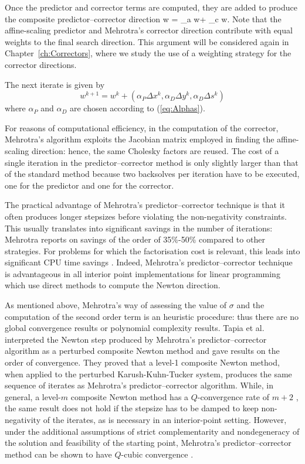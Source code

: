 Once the predictor and corrector terms are computed, they are 
added to produce the composite predictor--corrector direction
\be \label{eq:CompositeDirection}
\Delta w = \Delta_a w+ \Delta_c w.
\ee
Note that the affine-scaling predictor and Mehrotra's corrector direction 
contribute with equal weights to the final search direction. 
This argument will be considered again in Chapter~\ref{ch:Correctors}, 
where we study the use of a weighting strategy for the corrector
directions.

The next iterate is given by
\[
w^{k+1} = w^k
        + (\alpha_P\Delta x^k,\alpha_D\Delta y^k,\alpha_D\Delta s^k)
\]
where $\alpha_P$ and $\alpha_D$ are chosen according to (\ref{eq:Alphas}).

For reasons of computational efficiency, in the computation of
the corrector, Mehrotra's algorithm exploits 
the Jacobian matrix employed in finding the affine-scaling direction: 
hence, the same Cholesky factors are reused.
The cost of a single iteration in the predictor--corrector 
method is only slightly larger than that of the standard 
method because two backsolves per iteration have to be executed, 
one for the predictor and one for the corrector. 

The practical advantage of Mehrotra's predictor--corrector technique
is that it often produces longer stepsizes before violating the 
non-negativity constraints.
%
This usually translates into significant savings in the number of 
iterations: Mehrotra \cite{Mehrotra92} reports on savings of the
order of 35\%-50\% compared to other strategies.
For problems for which the factorisation cost is relevant, this
leads into significant 
CPU time savings \cite{LustigMarstenShanno,Mehrotra92}. Indeed, 
Mehrotra's predictor--corrector technique is advantageous in all 
interior point implementations for linear programming 
which use direct methods to compute 
the Newton direction.


As mentioned above, Mehrotra's way of assessing the value of $\sigma$
and the computation of the second order term is an heuristic procedure: 
thus there are 
no global convergence results or polynomial complexity results. 
Tapia et al. \cite{TapiaZhangSaltzmanWeiser} interpreted the Newton step 
produced by Mehrotra's predictor--corrector algorithm as a perturbed
composite Newton method and gave results on the order of convergence. 
They proved that a level-1 composite Newton method, when applied 
to the perturbed Karush-Kuhn-Tucker system, produces the same 
sequence of iterates as Mehrotra's predictor--corrector algorithm. 
While, in general, a level-$m$ composite Newton method has 
a $Q$-convergence rate of $m+2$ \cite{OrtegaRheinboldt},
the same result does not hold 
if the stepsize has to be damped to keep non-negativity of the iterates, 
as is necessary in an interior-point setting. However, under 
the additional assumptions of strict complementarity and nondegeneracy 
of the solution and feasibility of the starting point, Mehrotra's 
predictor--corrector method can be shown to have $Q$-cubic convergence
\cite{TapiaZhangSaltzmanWeiser}.


